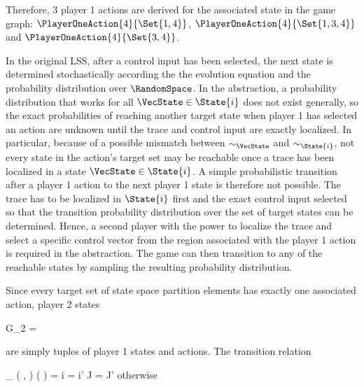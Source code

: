     Therefore, 3 player 1 actions are derived for the associated state in the game graph: $\PlayerOneAction{4}{\Set{1, 4}}$, $\PlayerOneAction{4}{\Set{1, 3, 4}}$ and $\PlayerOneAction{4}{\Set{3, 4}}$.

\stopsubsection


\startsubsection[title={Player 2},reference=sec:abstraction-graph-playertwo]

    In the original LSS, after a control input has been selected, the next state is determined stochastically according the the evolution equation and the probability distribution over $\RandomSpace$.
    In the abstraction, a probability distribution that works for all $\VecState \in \State{i}$ does not exist generally, so the exact probabilities of reaching another target state when player 1 has selected an action are unknown until the trace and control input are exactly localized.
    In particular, because of a possible mismatch between $\sim_\VecState$ and $\sim_{\State{i}}$, not every state in the action's target set may be reachable once a trace has been localized in a state $\VecState \in \State{i}$.
    A simple probabilistic transition after a player 1 action to the next player 1 state is therefore not possible.
    The trace has to be localized in $\State{i}$ first and the exact control input selected so that the transition probability distribution over the set of target states can be determined.
    Hence, a second player with the power to localize the trace and select a specific control vector from the region associated with the player 1 action is required in the abstraction.
    The game can then transition to any of the reachable states by sampling the resulting probability distribution.

    Since every target set of state space partition elements has exactly one associated action, player 2 states

    \startformula
        G_2 =  \EndComma
    \stopformula

    are simply tuples of player 1 states and actions.
    The transition relation

    \startformula
        \Transition_\GameGraph
            \Big( ,  \Big)
            \Big(  \Big)
        = \startmathcases
            \MC \startgathered
                    \NC \StartIf i = i' \MidAnd J = J'
                    \NR
                    \NC \quad \MidAnd {} \neq \emptyset
                    \NR
                \stopgathered
            \NR
            \NC otherwise
            \NR
        \stopmathcases
    \stopformula

